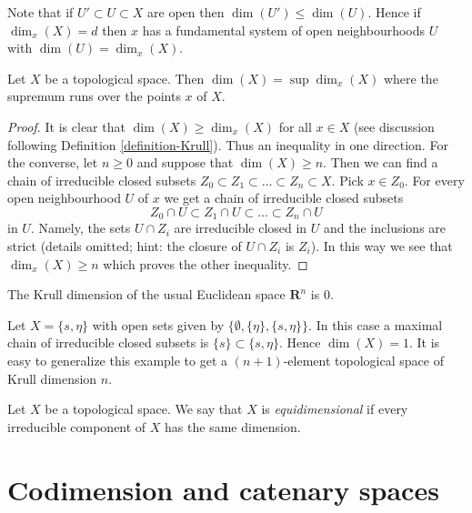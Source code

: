 \noindent
Note that if $U' \subset U \subset X$ are open then
$\dim(U') \leq \dim(U)$. Hence if $\dim_x(X) = d$ then $x$
has a fundamental system of open neighbourhoods $U$ with
$\dim(U) = \dim_x(X)$.

\begin{lemma}
\label{lemma-dimension-supremum-local-dimensions}
Let $X$ be a topological space. Then $\dim(X) = \sup \dim_x(X)$
where the supremum runs over the points $x$ of $X$.
\end{lemma}

\begin{proof}
It is clear that $\dim(X) \geq \dim_x(X)$ for all $x \in X$ (see
discussion following Definition \ref{definition-Krull}).
Thus an inequality in one direction. For the converse, let $n \geq 0$
and suppose that $\dim(X) \geq n$. Then we can find a chain of irreducible
closed subsets $Z_0 \subset Z_1 \subset \ldots \subset Z_n \subset X$.
Pick $x \in Z_0$. For every open neighbourhood $U$ of $x$ we get
a chain of irreducible closed subsets
$$
Z_0 \cap U \subset Z_1 \cap U \subset \ldots \subset Z_n \cap U
$$
in $U$. Namely, the sets $U \cap Z_i$ are irreducible closed in $U$ and the
inclusions are strict (details omitted; hint: the closure of $U \cap Z_i$
is $Z_i$).
In this way we see that $\dim_x(X) \geq n$ which proves the other
inequality.
\end{proof}

\begin{example}
\label{example-Krull-Rn}
The Krull dimension of the usual Euclidean space
$\mathbf{R}^n$ is $0$.
\end{example}

\begin{example}
\label{example-krull-2set}
Let $X = \{s, \eta\}$ with open sets given
by $\{\emptyset, \{\eta\}, \{s, \eta\}\}$.
In this case a maximal chain of irreducible
closed subsets is $\{s\} \subset \{s, \eta\}$.
Hence $\dim(X) = 1$. It is easy to generalize
this example to get a $(n + 1)$-element topological
space of Krull dimension $n$.
\end{example}

\begin{definition}
\label{definition-equidimensional}
Let $X$ be a topological space.
We say that $X$ is {\it equidimensional} if every irreducible
component of $X$ has the same dimension.
\end{definition}





\section{Codimension and catenary spaces}
\label{section-catenary-spaces}

